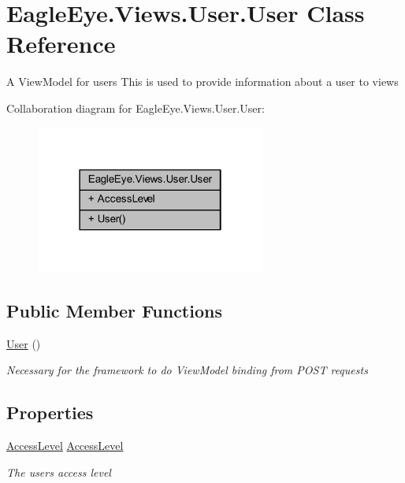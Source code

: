 \hypertarget{class_eagle_eye_1_1_views_1_1_user_1_1_user}{}\section{Eagle\+Eye.\+Views.\+User.\+User Class Reference}
\label{class_eagle_eye_1_1_views_1_1_user_1_1_user}


A View\+Model for users This is used to provide information about a user to views  




Collaboration diagram for Eagle\+Eye.\+Views.\+User.\+User\+:\nopagebreak
\begin{figure}[H]
\begin{center}
\leavevmode
\includegraphics[width=214pt]{class_eagle_eye_1_1_views_1_1_user_1_1_user__coll__graph}
\end{center}
\end{figure}
\subsection*{Public Member Functions}
\begin{DoxyCompactItemize}
\item 
\mbox{\hyperlink{class_eagle_eye_1_1_views_1_1_user_1_1_user_afaf7ca813d3573cb9a84ac392cfc5901}{User}} ()
\begin{DoxyCompactList}\small\item\em Necessary for the framework to do View\+Model binding from P\+O\+ST requests \end{DoxyCompactList}\end{DoxyCompactItemize}
\subsection*{Properties}
\begin{DoxyCompactItemize}
\item 
\mbox{\hyperlink{namespace_eagle_eye_1_1_views_1_1_user_a5ec08150416703595770d50460878d89}{Access\+Level}} \mbox{\hyperlink{class_eagle_eye_1_1_views_1_1_user_1_1_user_ad00af0bd442d99c28dd3068240226053}{Access\+Level}}
\begin{DoxyCompactList}\small\item\em The user\textquotesingle{}s access level \end{DoxyCompactList}\end{DoxyCompactItemize}


